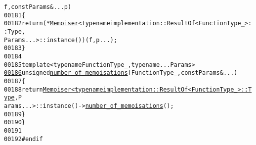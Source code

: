 \begin{footnotesize}
\begin{alltt}
      f, \textcolor{keyword}{const} Params & ... p)
00181     \{
00182         \textcolor{keywordflow}{return} (*\hyperlink{classeos_1_1Memoiser}{Memoiser}<\textcolor{keyword}{typename} implementation::ResultOf<FunctionType\_>::Type,
       Params ...>::instance())(f, p ...);
00183     \}
00184 
00185     \textcolor{keyword}{template} <\textcolor{keyword}{typename} FunctionType\_, \textcolor{keyword}{typename} ... Params>
\hypertarget{memoise_8hh_source_l00186}{}\hyperlink{namespaceeos_a82ca3bc4794ddeca0b97d4a66fa5a679}{00186}     \textcolor{keywordtype}{unsigned} \hyperlink{namespaceeos_a82ca3bc4794ddeca0b97d4a66fa5a679}{number_of_memoisations}(FunctionType\_, \textcolor{keyword}{const} Params & ...)
00187     \{
00188         \textcolor{keywordflow}{return} \hyperlink{classeos_1_1Memoiser}{Memoiser<typename implementation::ResultOf<FunctionType_>::Type}, P
      arams ...>::instance()->\hyperlink{namespaceeos_a82ca3bc4794ddeca0b97d4a66fa5a679}{number_of_memoisations}();
00189     \}
00190 \}
00191 
00192 \textcolor{preprocessor}{#endif}
\end{alltt}\end{footnotesize}

